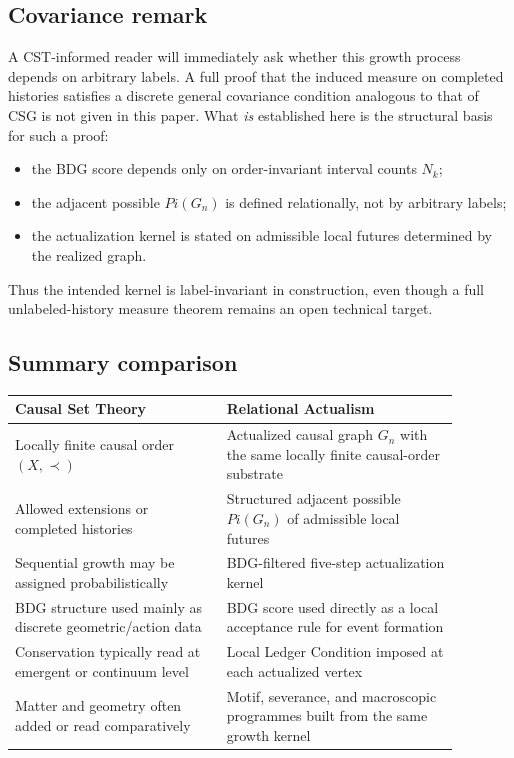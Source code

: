 \documentclass[11pt]{article}
\def\Pi{Pi}%
\begin{document}
\subsection{Covariance remark}

A CST-informed reader will immediately ask whether this growth process depends on arbitrary labels.
A full proof that the induced measure on completed histories satisfies a discrete general covariance condition analogous to that of CSG is not given in this paper. What \emph{is} established here is the structural basis for such a proof:

\begin{itemize}
\item the BDG score depends only on order-invariant interval counts $N_k$;
\item the adjacent possible $\Pi(G_n)$ is defined relationally, not by arbitrary labels;
\item the actualization kernel is stated on admissible local futures determined by the realized graph.
\end{itemize}

Thus the intended kernel is label-invariant in construction, even though a full unlabeled-history measure theorem remains an open technical target.

\subsection{Summary comparison}

\begin{center}
\begin{tabular}{p{0.42\linewidth}p{0.46\linewidth}}
\toprule
\textbf{Causal Set Theory} & \textbf{Relational Actualism} \\
\midrule
Locally finite causal order $(X,\prec)$ & Actualized causal graph $G_n$ with the same locally finite causal-order substrate \\
Allowed extensions or completed histories & Structured adjacent possible $\Pi(G_n)$ of admissible local futures \\
Sequential growth may be assigned probabilistically & BDG-filtered five-step actualization kernel \\
BDG structure used mainly as discrete geometric/action data & BDG score used directly as a local acceptance rule for event formation \\
Conservation typically read at emergent or continuum level & Local Ledger Condition imposed at each actualized vertex \\
Matter and geometry often added or read comparatively & Motif, severance, and macroscopic programmes built from the same growth kernel \\
\bottomrule
\end{tabular}
\end{center}
\end{document}
